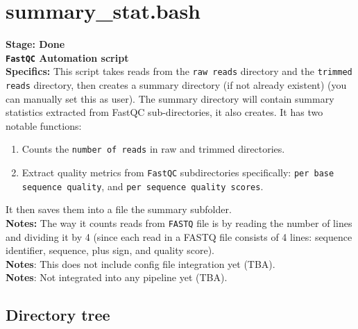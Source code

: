 \documentclass[11pt]{report}
\begin{document}
{\linenumbers*
\section{summary\_stat.bash}
\textbf{Stage: Done} \\   
\textbf{\texttt{FastQC} Automation script} \\
\textbf{Specifics:} This script takes reads from the \texttt{raw reads} directory and the \texttt{trimmed reads} directory, then creates a summary directory (if not already existent) (you can manually set this as user). The summary directory will contain summary statistics extracted from FastQC sub-directories, it also creates. It has two notable functions: \begin{enumerate}
	\item Counts the \texttt{number of reads} in raw and trimmed directories.  
	\item Extract quality metrics from \texttt{FastQC} subdirectories specifically: \texttt{per base sequence quality}, and \texttt{per sequence quality scores}.
\end{enumerate} 
It then saves them into a file the summary subfolder.  \\
\textbf{Notes:} The way it counts reads from \texttt{FASTQ} file is by reading the number of lines and dividing it by 4 (since each read in a FASTQ file consists of 4 lines: sequence identifier, sequence, plus sign, and quality score). \\
\textbf{Notes}: This does not include config file integration yet (TBA). \\ 
\textbf{Notes}: Not integrated into any pipeline yet (TBA). 

\subsection{Directory tree}



}
\end{document}
